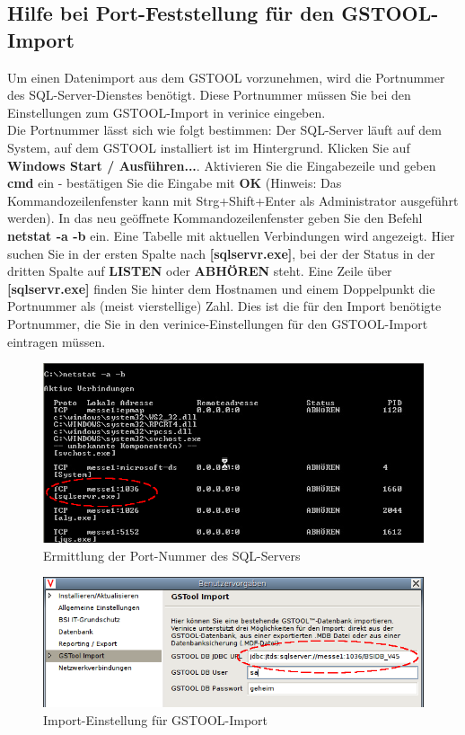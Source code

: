 \documentclass[a4paper,10pt]{book}
\begin{document}
\subsection{Hilfe bei Port-Feststellung für den GSTOOL-Import}
Um einen Datenimport aus dem \textsc{GSTOOL} vorzunehmen, wird die Portnummer des SQL-Server-Dienstes benötigt. Diese Portnummer müssen Sie bei den
Einstellungen zum \textsc{GSTOOL}-Import in verinice eingeben.
\newline\\
Die Portnummer lässt sich wie folgt bestimmen: Der SQL-Server läuft auf dem System, auf dem \textsc{GSTOOL} installiert ist im Hintergrund.
Klicken Sie auf \textbf{Windows Start / Ausführen...}. Aktivieren Sie die Eingabezeile und geben \textbf{cmd} ein - bestätigen Sie die Eingabe mit
\textbf{OK} (Hinweis: Das Kommandozeilenfenster kann mit Strg+Shift+Enter als Administrator ausgeführt werden). In das neu geöffnete Kommandozeilenfenster
geben Sie den Befehl \textbf{netstat -a -b} ein. Eine Tabelle mit aktuellen Verbindungen wird angezeigt. Hier suchen Sie in der ersten Spalte nach
\textbf{[sqlservr.exe]}, bei der der Status in der dritten Spalte auf \textbf{LISTEN} oder \textbf{ABHÖREN} steht. Eine Zeile über \textbf{[sqlservr.exe]}
finden Sie hinter dem Hostnamen und einem Doppelpunkt die Portnummer als (meist vierstellige) Zahl. Dies ist die für den Import benötigte Portnummer,
die Sie in den verinice-Einstellungen für den \textsc{GSTOOL}-Import eintragen müssen.
\newline
\begin{figure}[htb!]
  \centering
  \includegraphics[scale=.7]{Screenshot/Verinice_netstat_gstool.png}
  \caption{\label{Ermittlung der Port-Nummer des SQL-Servers} Ermittlung der Port-Nummer des SQL-Servers}
\end{figure}
\newline
\begin{figure}[htb!]
  \centering
  \includegraphics[scale=.8]{Screenshot/Gstool_import_portsettings.png}
  \caption{\label{Import-Einstellung fuer GSTOOL-Import} Import-Einstellung für GSTOOL-Import}
\end{figure}
\newline
\end{document}
